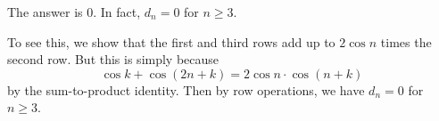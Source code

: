 The answer is $0$. In fact, $d_n=0$ for $n\geq3$.

To see this, we show that the first and third rows add up to $2\cos n$ times the second row. But this is simply because \[\cos k+\cos(2n+k)=2\cos n\cdot\cos(n+k)\] by the sum-to-product identity. Then by row operations, we have $d_n=0$ for $n\geq3$.